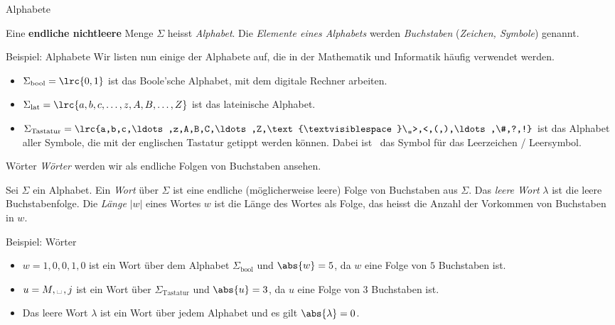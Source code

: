 \begin{frame}[fragile]{Alphabete}
\begin{mydefinition}[Alphabet]\label{mydefinition:Alphabet}
Eine \textbf{endliche nichtleere} Menge $\Sigma$ heisst \textit{Alphabet}. Die \textit{Elemente eines Alphabets} werden \textit{Buchstaben} (\textit{Zeichen, Symbole}) genannt.
\end{mydefinition}
\end{frame}

\begin{frame}[fragile]{Beispiel: Alphabete}
Wir listen nun einige der Alphabete auf, die in der Mathematik und Informatik häufig verwendet werden.
\begin{myexample}
	\phantom{1}
\begin{itemize}[<+->]
	\item $\Sigma_{\text{bool}} = \lrc{0,1}$ ist das Boole'sche Alphabet, mit dem digitale Rechner arbeiten.
	\item $\Sigma_{\text{lat}} = \lrc{a,b,c,\ldots ,z,A,B,\ldots ,Z}$ ist das lateinische Alphabet.
	\item $\Sigma_{\text{Tastatur}} = \lrc{a,b,c,\ldots ,z,A,B,C,\ldots ,Z,\text{\textvisiblespace}\,,>,<,(,),\ldots ,\#,?,!}$ ist das Alphabet aller Symbole, die mit der englischen Tastatur getippt werden können. Dabei ist \textvisiblespace\ das Symbol für das Leerzeichen / Leersymbol.
\end{itemize}
\end{myexample}
\end{frame}

\begin{frame}[fragile]{Wörter}
\textit{Wörter} werden wir als endliche Folgen von Buchstaben ansehen.
\begin{mydefinition}[Wort]\label{mydefinition:Wort}
Sei $\Sigma$ ein Alphabet. Ein \textit{Wort} über $\Sigma$ ist eine endliche (möglicherweise leere) Folge von Buchstaben aus $\Sigma$. Das \textit{leere Wort} $\lambda$ ist die leere Buchstabenfolge.
Die \textit{Länge} $|w|$ eines Wortes $w$ ist die Länge des Wortes als Folge, das heisst die Anzahl der Vorkommen von Buchstaben in $w$.
\end{mydefinition}
\end{frame}

\begin{frame}[fragile]{Beispiel: Wörter}
\begin{myexample}
\begin{itemize}[<+->]
	\item $w = 1,0,0,1,0$ ist ein Wort über dem Alphabet $\Sigma_{\text{bool}}$ und $\abs{w} = 5$, da $w$ eine Folge von $5$ Buchstaben ist.
	\item $u = M,\text{\textvisiblespace}\,, j$ ist ein Wort über $\Sigma_{\text{Tastatur}}$ und $\abs{u} = 3$, da $u$ eine Folge von $3$ Buchstaben ist.
	\item Das leere Wort $\lambda$ ist ein Wort über jedem Alphabet und es gilt $\abs{\lambda} = 0$.
\end{itemize}
\end{myexample}
\end{frame}

